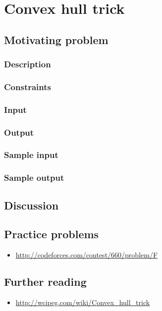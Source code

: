 \section{Convex hull trick}

\subsection*{Motivating problem}

\subsubsection*{Description}

\subsubsection*{Constraints}

\subsubsection*{Input}

\subsubsection*{Output}

\subsubsection*{Sample input}

\subsubsection*{Sample output}

\subsection*{Discussion}

\subsection*{Practice problems}

\begin{itemize}
\item \url{http://codeforces.com/contest/660/problem/F}
\end{itemize}

\subsection*{Further reading}

\begin{itemize}
\item \url{http://wcipeg.com/wiki/Convex_hull_trick}
\end{itemize}
